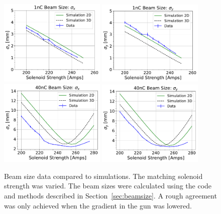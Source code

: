 \begin{figure}
	\includegraphics[width=0.45\textwidth]{images/xbeamsizes_low_charge_sol_scan_11-02-2017}%
	\includegraphics[width=0.45\textwidth]{images/ybeamsizes_low_charge_sol_scan_11-02-2017}\\
	
	
	\includegraphics[width=0.45\textwidth]{images/xbeamsizes_high_charge_sol_scan_10-17-2017}%
	\includegraphics[width=0.45\textwidth]{images/ybeamsizes_high_charge_sol_scan_10-17-2017}
	\caption{Beam size data compared to simulations. The matching solenoid strength was varied. 
	The beam sizes were calculated using the code and methods described in Section~\ref{sec:beamsize}. 
	A rough agreement was only achieved when the gradient in the gun was lowered.}
\label{fig:solscan}
\end{figure}


